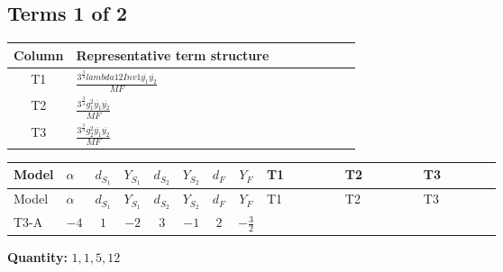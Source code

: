 \documentclass[8pt]{article}
\begin{document}
\begin{landscape}
\subsection*{Terms 1 of 2}
\begin{center}
\begin{tabular}{@{}c >{\raggedright\arraybackslash}p{0.82\linewidth}@{}}
\toprule
Column & Representative term structure \\
\midrule
T1 & \(\displaystyle \frac{3^{\frac{3}{4}} lambda12Inv1 \overline{y_{1}} \overline{y_{2}}}{MF}\) \\
\midrule
T2 & \(\displaystyle \frac{3^{\frac{3}{4}} g_{1}^{2} \overline{y_{1}} \overline{y_{2}}}{MF}\) \\
\midrule
T3 & \(\displaystyle \frac{3^{\frac{3}{4}} g_{2}^{2} \overline{y_{1}} \overline{y_{2}}}{MF}\) \\
\midrule
\bottomrule
\end{tabular}
\end{center}
\smallskip
\tiny
\begin{longtable}{@{}llcccccc >{\raggedright\arraybackslash}p{0.21\linewidth} >{\raggedright\arraybackslash}p{0.21\linewidth} >{\raggedright\arraybackslash}p{0.21\linewidth}@{}}
\toprule
Model & $\alpha$ & $d_{S_1}$ & $Y_{S_1}$ & $d_{S_2}$ & $Y_{S_2}$ & $d_F$ & $Y_F$ & T1 & T2 & T3 \\
\midrule
\endfirsthead
\toprule
Model & $\alpha$ & $d_{S_1}$ & $Y_{S_1}$ & $d_{S_2}$ & $Y_{S_2}$ & $d_F$ & $Y_F$ & T1 & T2 & T3 \\
\midrule
\endhead
T3-A & $-4$ & $1$ & $-2$ & $3$ & $-1$ & $2$ & $-\frac{3}{2}$ & \scriptsize\adjustbox{max width=\linewidth}{$\begin{gathered} \frac{3^{\frac{3}{4}} lambda12Inv1 \overline{y_{1}} \overline{y_{2}}}{6 MF}\end{gathered}$} & \scriptsize\adjustbox{max width=\linewidth}{$\begin{gathered} \frac{9 \cdot 3^{\frac{3}{4}} g_{1}^{2} \overline{y_{1}} \overline{y_{2}}}{8 MF}\end{gathered}$} & \scriptsize\adjustbox{max width=\linewidth}{$\begin{gathered} \frac{17 \cdot 3^{\frac{3}{4}} g_{2}^{2} \overline{y_{1}} \overline{y_{2}}}{24 MF}\end{gathered}$} \\
\midrule
\bottomrule
\end{longtable}
\clearpage
\noindent\textbf{Quantity: }$\mathrm{1,1,5,12}$\par\smallskip

\end{landscape}
\end{document}
